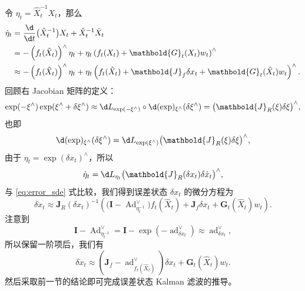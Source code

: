 \documentclass[fontset=none,zihao=-4]{Notes}
\DeclareMathOperator\Ad{Ad}
\DeclareMathOperator\ad{ad}
\newcommand{\mat}[1]{\mathbold{#1}}
\begin{document}
令 $\eta_t=\hat X_t^{-1}X_t$，那么
\begin{equation}\label{eq:error_sde}
  \begin{aligned}
    \dot \eta_t&=\frac{\d}{\d t} \bigl(\hat X_t^{-1}\bigr)X_t+
    \hat X_t^{-1}\dot X_t\\
    &=-\left(
      f_t(\hat X_t)
    \right)^\wedge\eta_t+\eta_t\left(
      f_t( X_t)+ \mat G_t(X_t) w_t
    \right)^\wedge\\
    &\approx -\left(
      f_t(\hat X_t)
    \right)^\wedge\eta_t+\eta_t\left(
      f_t(\hat X_t)+\mat J_f\delta x_t+\mat G_t(\hat X_t) w_t
      \right)^\wedge.
  \end{aligned} 
\end{equation}
回顾右 Jacobian 矩阵的定义：
\[
  \exp(-\xi^\wedge)\exp(\xi^\wedge+\delta \xi^\wedge)\approx 
  \d L_{\exp(-\xi^\wedge)}\circ \d (\exp)_{\xi^\wedge} (\delta \xi^\wedge)=
  \bigl(\mat J_R(\xi)\delta \xi\bigr)^\wedge,
\]
也即
\[
  \d (\exp)_{\xi^\wedge}(\delta \xi^\wedge)=\d L_{\exp(\xi^\wedge)}\bigl( \mat J_R(\xi)\delta \xi\bigr)^\wedge,
\]
由于 $\eta_t=\exp(\delta x_t)^\wedge$，所以
\[
  \dot\eta_t=\d L_{\eta_t}\bigl(\mat J_R(\delta x_t)\delta\dot x_t\bigr)^\wedge,
\]
与 \eqref{eq:error_sde} 式比较，我们得到误差状态 $\delta x_t$ 的微分方程为
\[
  \delta \dot x_t\approx\mat J_R(\delta x_t)^{-1}
  \left(
    \bigl(\mat I-\Ad_{\eta_t^{-1}}^\vee\bigr)
      f_t(\hat X_t)+\mat J_f\delta x_t
  +
  \mat G_t(\hat X_t) w_t
  \right).
\]
注意到 
\[
  \mat I-\Ad_{\eta_t^{-1}}^\vee=\mat I-\exp(-\ad_{\delta x_t}^\vee)\approx \ad_{\delta x_t}^\vee,
\]
所以保留一阶项后，我们有
\[
  \delta\dot x_t\approx \left(\mat J_f -\ad_{f_t(\hat X_t)}^\vee\right)\delta x_t+\mat G_t(\hat X_t) w_t.
\]
然后采取前一节的结论即可完成误差状态 Kalman 滤波的推导。
\end{document}
